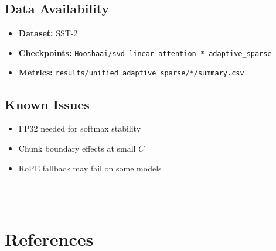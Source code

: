 \subsection{Data Availability}

\begin{itemize}
\item \textbf{Dataset:} SST-2
\item \textbf{Checkpoints:} \texttt{Hooshaai/svd-linear-attention-*-adaptive\_sparse}
\item \textbf{Metrics:} \texttt{results/unified\_adaptive\_sparse/*/summary.csv}

\end{itemize}
\subsection{Known Issues}

\begin{itemize}
\item FP32 needed for softmax stability
\item Chunk boundary effects at small $C$
\item RoPE fallback may fail on some models
\end{itemize}
\begin{lstlisting}

---
\end{lstlisting}


\section{References}

